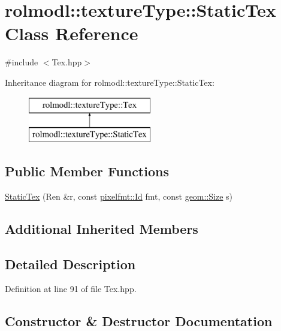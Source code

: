 \hypertarget{classrolmodl_1_1texture_type_1_1_static_tex}{}\section{rolmodl\+::texture\+Type\+::Static\+Tex Class Reference}
\label{classrolmodl_1_1texture_type_1_1_static_tex}


{\ttfamily \#include $<$Tex.\+hpp$>$}

Inheritance diagram for rolmodl\+::texture\+Type\+::Static\+Tex\+:\begin{figure}[H]
\begin{center}
\leavevmode
\includegraphics[height=2.000000cm]{classrolmodl_1_1texture_type_1_1_static_tex}
\end{center}
\end{figure}
\subsection*{Public Member Functions}
\begin{DoxyCompactItemize}
\item 
\mbox{\hyperlink{classrolmodl_1_1texture_type_1_1_static_tex_a425488c85873778bc23d30508be163fa}{Static\+Tex}} (Ren \&r, const \mbox{\hyperlink{namespacerolmodl_1_1pixelfmt_a96282713e4465ba9211c8fd3a702b52b}{pixelfmt\+::\+Id}} fmt, const \mbox{\hyperlink{structrolmodl_1_1geom_1_1_size}{geom\+::\+Size}} s)
\end{DoxyCompactItemize}
\subsection*{Additional Inherited Members}


\subsection{Detailed Description}


Definition at line 91 of file Tex.\+hpp.



\subsection{Constructor \& Destructor Documentation}
\mbox{\label{classrolmodl_1_1texture_type_1_1_static_tex_a425488c85873778bc23d30508be163fa}} 
